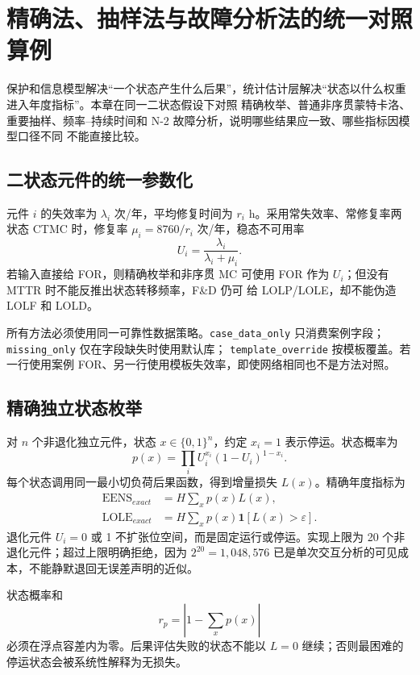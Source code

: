 \section{精确法、抽样法与故障分析法的统一对照算例}\label{sec:rel-estimation-casebook}

保护和信息模型解决“一个状态产生什么后果”，统计估计层解决“状态以什么权重进入年度指标”。本章在同一二状态假设下对照
精确枚举、普通非序贯蒙特卡洛、重要抽样、频率--持续时间和 N-2 故障分析，说明哪些结果应一致、哪些指标因模型口径不同
不能直接比较。

\subsection{二状态元件的统一参数化}
元件 $i$ 的失效率为 $\lambda_i$ 次/年，平均修复时间为 $r_i$ h。采用常失效率、常修复率两状态 CTMC 时，修复率
$\mu_i=8760/r_i$ 次/年，稳态不可用率
\begin{equation}\label{eq:rel-case-unavailability}
 U_i=\frac{\lambda_i}{\lambda_i+\mu_i}.
\end{equation}
若输入直接给 FOR，则精确枚举和非序贯 MC 可使用 FOR 作为 $U_i$；但没有 MTTR 时不能反推出状态转移频率，F\&D 仍可
给 LOLP/LOLE，却不能伪造 LOLF 和 LOLD。

所有方法必须使用同一可靠性数据策略。\verb|case_data_only| 只消费案例字段；\verb|missing_only| 仅在字段缺失时使用默认库；
\verb|template_override| 按模板覆盖。若一行使用案例 FOR、另一行使用模板失效率，即使网络相同也不是方法对照。

\subsection{精确独立状态枚举}
对 $n$ 个非退化独立元件，状态 $x\in\{0,1\}^n$，约定 $x_i=1$ 表示停运。状态概率为
\begin{equation}
 p(x)=\prod_iU_i^{x_i}(1-U_i)^{1-x_i}.
\end{equation}
每个状态调用同一最小切负荷后果函数，得到增量损失 $L(x)$。精确年度指标为
\begin{align}
 \mathrm{EENS}_{exact}&=H\sum_xp(x)L(x),\\
 \mathrm{LOLE}_{exact}&=H\sum_xp(x)\mathbf1[L(x)>\varepsilon].
\end{align}
退化元件 $U_i=0$ 或 1 不扩张位空间，而是固定运行或停运。实现上限为 20 个非退化元件；超过上限明确拒绝，因为
$2^{20}=1,048,576$ 已是单次交互分析的可见成本，不能静默退回无误差声明的近似。

状态概率和
\begin{equation}
 r_p=\left|1-\sum_xp(x)\right|
\end{equation}
必须在浮点容差内为零。后果评估失败的状态不能以 $L=0$ 继续；否则最困难的停运状态会被系统性解释为无损失。

